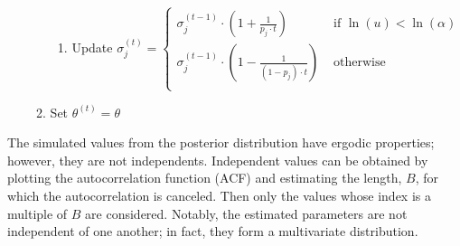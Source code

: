\documentclass[11pt,fleqn]{book} %
\begin{document}
\begin{algorithm}
\begin{itemize}
\begin{enumerate}
\begin{enumerate}[label=\alph*.]
				\item Update $\sigma_j^{(t)} = \left\{
					\begin{array}{ll}
						\sigma_j^{(t-1)} \cdot \left( 1 + \frac{1}{p_j \cdot t} \right) & \text{ if } \ln(u) < \ln(\alpha) \\
						\sigma_j^{(t-1)} \cdot \left( 1 - \frac{1}{(1-p_j) \cdot t} \right) & \text{ otherwise } \\
					\end{array}
				\right.$
			\end{enumerate}
			\item Set $\theta^{(t)}=\theta$
		\end{enumerate}
	\end{itemize}
\end{algorithm}

The simulated values from the posterior distribution have ergodic properties;
however, they are not independents. Independent values can be obtained by 
plotting the autocorrelation function (ACF) and estimating the length, $B$, 
for which the autocorrelation is canceled. Then only the values whose index 
is a multiple of $B$ are considered. Notably, the estimated parameters are 
not independent of one another; in fact, they form a multivariate distribution.
\end{document}

